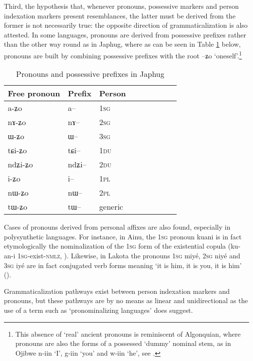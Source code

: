 \documentclass[oldfontcommands,oneside,a4paper,11pt]{article}
\newcommand{\ipa}[1]{{\phon \mbox{#1}}} %
\begin{document}
Third, the hypothesis that, whenever pronouns, possessive markers and person indexation markers present resemblances, the latter must be derived from the former is not necessarily true: the opposite direction of grammaticalization is also attested. In some languages, pronouns are derived from possessive prefixes rather than the other way round as in Japhug, where as can be seen in Table \ref{tab:pronoun} below, pronouns are built by combining possessive prefixes with the root \ipa{--ʑo} `oneself'.\footnote{This absence of `real' ancient pronouns is reminiscent of Algonquian, where pronouns are also the forms of a possessed `dummy' nominal stem, as in Ojibwe \ipa{n-iin} `I', \ipa{g-iin} `you' and \ipa{w-iin} `he', see \citet{valentine01grammar}. }

 \begin{table}[H] \centering
\caption{Pronouns and possessive prefixes in Japhug}\label{tab:pronoun}
\begin{tabular}{lllllllll} 
\toprule
 Free pronoun & Prefix & Person\\
\midrule
 \ipa{a-ʑo}  &	\ipa{a--}  &		1\textsc{sg} \\
\ipa{nɤ-ʑo}  &	\ipa{nɤ--}  &			2\textsc{sg}\\
\ipa{ɯ-ʑo}  &	\ipa{ɯ--}  &			3\textsc{sg}\\
\midrule
\ipa{tɕi-ʑo}  &	\ipa{tɕi--}  &			1\textsc{du} \\
\ipa{ndʑi-ʑo}  &	\ipa{ndʑi--}  &		2\textsc{du} \\	
\midrule
\ipa{i-ʑo}    &	\ipa{i--}  &			1\textsc{pl} \\
\ipa{nɯ-ʑo}   &	\ipa{nɯ--}  &			2\textsc{pl} \\
\midrule
\ipa{tɯ-ʑo} & \ipa{tɯ--}   &  generic\\
\bottomrule
\end{tabular}
\end{table}

Cases of pronouns derived from personal affixes are also found, especially in polysynthetic languages. For instance, in Ainu, the \textsc{1sg} pronoun \ipa{kuani} is in fact etymologically the nominalization of the \textsc{1sg} form of the existential copula (\ipa{ku-an-i} \textsc{1sg}-exist-\textsc{nmlz}, \citealt[31]{shibatani90japan}). Likewise, in Lakota the pronouns \textsc{1sg} \ipa{miyé}, \textsc{2sg} \ipa{niyé} and \textsc{3sg} \ipa{iyé} are in fact conjugated verb forms meaning `it is him, it is you, it is him' (\citealt[707;754]{ullrich08}).

Grammaticalization pathways exist between person indexation markers and pronouns, but these pathways are by no means as linear and unidirectional as the use of a term such as `pronominalizing languages' does suggest. 
\end{document}
